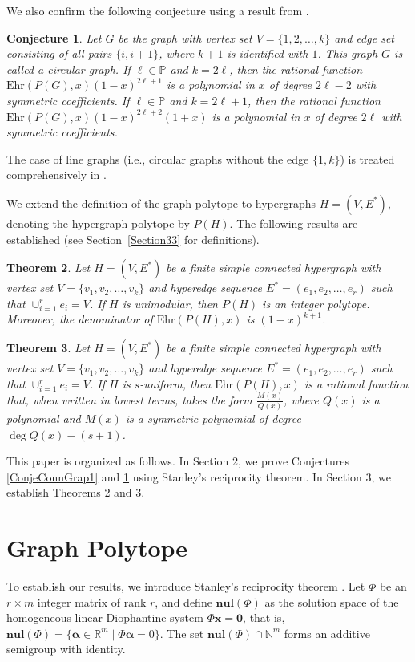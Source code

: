 \documentclass[reqno, 12pt]{amsart}
\newtheorem{thm}{Theorem}[section]
\newtheorem{cnj}[thm]{Conjecture}
\theoremstyle{mydefinition}
\theoremstyle{myremark}
\begin{document}
We also confirm the following conjecture using a result from \cite{XinZhongZhou}.
\begin{cnj}\cite[Remark 6.2]{BonaJuAnn06}\label{ConjeCircularGrap3}
Let $G$ be the graph with vertex set $V=\{1,2,\ldots, k\}$ and edge set consisting of all pairs $\{i,i+1\}$, where $k+1$ is identified with $1$. This graph $G$ is called a \emph{circular graph}.
If $\ell \in \mathbb{P}$ and $k=2\ell$, then the rational function $\mathrm{Ehr}(P(G),x)(1-x)^{2\ell+1}$ is a polynomial in $x$ of degree $2\ell-2$ with symmetric coefficients.
If $\ell \in \mathbb{P}$ and $k=2\ell+1$, then the rational function $\mathrm{Ehr}(P(G),x)(1-x)^{2\ell+2}(1+x)$ is a polynomial in $x$ of degree $2\ell$ with symmetric coefficients.
\end{cnj}
The case of line graphs (i.e., circular graphs without the edge $\{1, k\}$) is treated comprehensively in \cite{XinZhong23}.

We extend the definition of the graph polytope to hypergraphs $H=(V,E^*)$, denoting the hypergraph polytope by $P(H)$. The following results are established (see Section~\ref{Section33} for definitions).
\begin{thm}\label{UnimodularHyperG}
Let $H=(V,E^*)$ be a finite simple connected hypergraph with vertex set $V=\{v_1,v_2,\ldots, v_k\}$ and hyperedge sequence $E^*=(e_1,e_2,\ldots,e_r)$ such that $\cup_{i=1}^r e_i=V$. If $H$ is unimodular, then $P(H)$ is an integer polytope. Moreover, the denominator of $\mathrm{Ehr}(P(H),x)$ is $(1-x)^{k+1}$.
\end{thm}

\begin{thm}\label{UniformHyperGr}
Let $H=(V,E^*)$ be a finite simple connected hypergraph with vertex set $V=\{v_1,v_2,\ldots, v_k\}$ and hyperedge sequence $E^*=(e_1,e_2,\ldots,e_r)$ such that $\cup_{i=1}^r e_i=V$. If $H$ is $s$-uniform, then $\mathrm{Ehr}(P(H),x)$ is a rational function that, when written in lowest terms, takes the form $\frac{M(x)}{Q(x)}$, where $Q(x)$ is a polynomial and $M(x)$ is a symmetric polynomial of degree $\deg Q(x) - (s+1)$.
\end{thm}

This paper is organized as follows.
In Section 2, we prove Conjectures \ref{ConjeConnGrap1} and \ref{ConjeCircularGrap3} using Stanley's reciprocity theorem.
In Section 3, we establish Theorems \ref{UnimodularHyperG} and \ref{UniformHyperGr}.


\section{Graph Polytope}
To establish our results, we introduce Stanley's reciprocity theorem \cite[Theorem 4.1]{StanleyMagic73}.
Let $\Phi$ be an $r \times m$ integer matrix of rank $r$, and define $\textbf{nul}(\Phi)$ as the solution space of the homogeneous linear Diophantine system $\Phi \mathbf{x} = \mathbf{0}$, that is, $\textbf{nul}(\Phi) = \{\boldsymbol{\alpha} \in \mathbb{R}^m \mid \Phi \boldsymbol{\alpha} = 0\}$.
The set $\textbf{nul}(\Phi) \cap \mathbb{N}^m$ forms an additive semigroup with identity.
\end{document}
